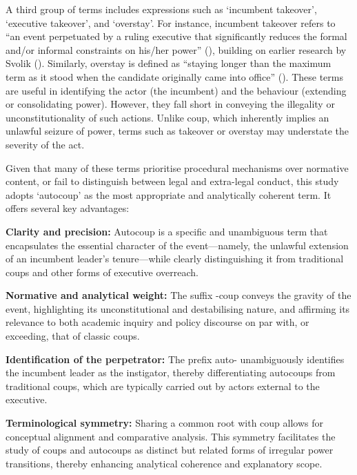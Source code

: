 \documentclass[
  12pt,
]{report}
\begin{document}
A third group of terms includes expressions such as `incumbent
takeover', `executive takeover', and `overstay'. For instance, incumbent
takeover refers to ``an event perpetuated by a ruling executive that
significantly reduces the formal and/or informal constraints on his/her
power'' (),
building on earlier research by Svolik
(). Similarly, overstay is defined as
``staying longer than the maximum term as it stood when the candidate
originally came into office''
(). These terms are useful in identifying the actor (the incumbent)
and the behaviour (extending or consolidating power). However, they fall
short in conveying the illegality or unconstitutionality of such
actions. Unlike coup, which inherently implies an unlawful seizure of
power, terms such as takeover or overstay may understate the severity of
the act.

Given that many of these terms prioritise procedural mechanisms over
normative content, or fail to distinguish between legal and extra-legal
conduct, this study adopts `autocoup' as the most appropriate and
analytically coherent term. It offers several key advantages:

\textbf{Clarity and precision:} Autocoup is a specific and unambiguous
term that encapsulates the essential character of the event---namely,
the unlawful extension of an incumbent leader's tenure---while clearly
distinguishing it from traditional coups and other forms of executive
overreach.

\textbf{Normative and analytical weight:} The suffix -coup conveys the
gravity of the event, highlighting its unconstitutional and
destabilising nature, and affirming its relevance to both academic
inquiry and policy discourse on par with, or exceeding, that of classic
coups.

\textbf{Identification of the perpetrator:} The prefix auto-
unambiguously identifies the incumbent leader as the instigator, thereby
differentiating autocoups from traditional coups, which are typically
carried out by actors external to the executive.

\textbf{Terminological symmetry:} Sharing a common root with coup allows
for conceptual alignment and comparative analysis. This symmetry
facilitates the study of coups and autocoups as distinct but related
forms of irregular power transitions, thereby enhancing analytical
coherence and explanatory scope.
\end{document}
